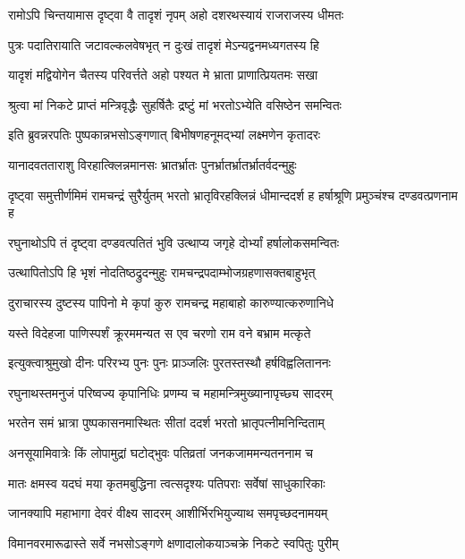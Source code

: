 \twolineshloka
{रामोऽपि चिन्तयामास दृष्ट्वा वै तादृशं नृपम्}
{अहो दशरथस्यायं राजराजस्य धीमतः}%

\twolineshloka
{पुत्रः पदातिरायाति जटावल्कलवेषभृत्}
{न दुःखं तादृशं मेऽन्यद्वनमध्यगतस्य हि}%

\twolineshloka
{यादृशं मद्वियोगेन चैतस्य परिवर्त्तते}
{अहो पश्यत मे भ्राता प्राणात्प्रियतमः सखा}%

\twolineshloka
{श्रुत्वा मां निकटे प्राप्तं मन्त्रिवृद्धैः सुहर्षितैः}
{द्रष्टुं मां भरतोऽभ्येति वसिष्ठेन समन्वितः}%

\twolineshloka
{इति ब्रुवन्नरपतिः पुष्पकान्नभसोऽङ्गणात्}
{बिभीषणहनूमद्भ्यां लक्ष्मणेन कृतादरः}%

\twolineshloka
{यानादवतताराशु विरहात्क्लिन्नमानसः}
{भ्रातर्भ्रातः पुनर्भ्रातर्भ्रातर्भ्रातर्वदन्मुहुः}%

\threelineshloka
{दृष्ट्वा समुत्तीर्णमिमं रामचन्द्रं सुरैर्युतम्}
{भरतो भ्रातृविरहक्लिन्नं धीमान्ददर्श ह}
{हर्षाश्रूणि प्रमुञ्चंश्च दण्डवत्प्रणनाम ह}%

\twolineshloka
{रघुनाथोऽपि तं दृष्ट्वा दण्डवत्पतितं भुवि}
{उत्थाप्य जगृहे दोर्भ्यां हर्षालोकसमन्वितः}%

\twolineshloka
{उत्थापितोऽपि हि भृशं नोदतिष्ठद्रुदन्मुहुः}
{रामचन्द्रपदाम्भोजग्रहणासक्तबाहुभृत्}%


\twolineshloka
{दुराचारस्य दुष्टस्य पापिनो मे कृपां कुरु}
{रामचन्द्र महाबाहो कारुण्यात्करुणानिधे}%

\twolineshloka
{यस्ते विदेहजा पाणिस्पर्शं क्रूरममन्यत}
{स एव चरणो राम वने बभ्राम मत्कृते}%

\twolineshloka
{इत्युक्त्वाश्रुमुखो दीनः परिरभ्य पुनः पुनः}
{प्राञ्जलिः पुरतस्तस्थौ हर्षविह्वलिताननः}%

\twolineshloka
{रघुनाथस्तमनुजं परिष्वज्य कृपानिधिः}
{प्रणम्य च महामन्त्रिमुख्यानापृच्छ्य सादरम्}%

\twolineshloka
{भरतेन समं भ्रात्रा पुष्पकासनमास्थितः}
{सीतां ददर्श भरतो भ्रातृपत्नीमनिन्दिताम्}%

\twolineshloka
{अनसूयामिवात्रेः किं लोपामुद्रां घटोद्भुवः}
{पतिव्रतां जनकजाममन्यतननाम च}%

\twolineshloka
{मातः क्षमस्व यदघं मया कृतमबुद्धिना}
{त्वत्सदृश्यः पतिपराः सर्वेषां साधुकारिकाः}%

\twolineshloka
{जानक्यापि महाभागा देवरं वीक्ष्य सादरम्}
{आशीर्भिरभियुज्याथ समपृच्छदनामयम्}%

\twolineshloka
{विमानवरमारूढास्ते सर्वे नभसोऽङ्गणे}
{क्षणादालोकयाञ्चक्रे निकटे स्वपितुः पुरीम्}%

